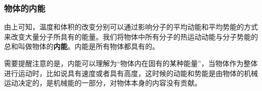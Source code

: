 \subsubsection{物体的内能}
由上可知，温度和体积的改变分别可以通过影响分子的平均动能和平均势能的方式来改变大量分子所具有的能量。我们将物体中所有分子的热运动动能与分子势能的总和叫做物体的\textbf{内能}。内能是所有物体都具有的。

需要提醒注意的是，内能可以理解为“物体内在固有的某种能量”，当物体作为整体进行运动时，比如说具有速度或者具有高度，这时候的动能和势能是由物体的机械运动决定的，是机械能的一部分，对物体本身的内容没有贡献。





